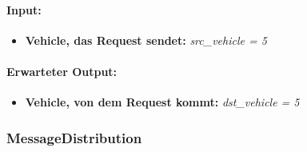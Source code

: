\documentclass[a4paper, 12pt, titlepage]{scrartcl}
\begin{document}
			\paragraph{Input:}
			\begin{itemize} \itemsep-0.5em
				\item \textbf{Vehicle, das Request sendet:} \emph{src\_vehicle = 5}
			\end{itemize}
			\paragraph{Erwarteter Output:}
			\begin{itemize} \itemsep-0.5em
				\item \textbf{Vehicle, von dem Request kommt:} \emph{dst\_vehicle = 5}
			\end{itemize} 			

			\subsubsection{MessageDistribution}
			\label{node_message_distribution}
\end{document}
